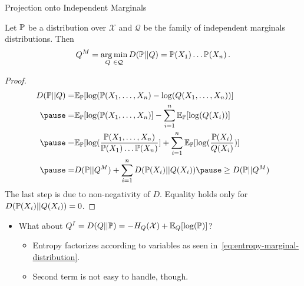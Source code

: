 \begin{frame}{Projection onto Independent Marginals}
\begin{theorem}
Let $\Pb$ be a distribution over $\mathcal{X}$ and $\mathcal{Q}$ be the family of independent marginals distributions. Then
\begin{equation}
    Q^M = \argmin_{Q \ \in \mathcal{Q}} D(\Pb || Q) = \Pb(X_1) \dots \Pb(X_n)\,.
\end{equation}
\end{theorem}
\pause
\begin{proof}
    \begin{equation}
        \begin{aligned}
            D(\Pb || Q) = &\E_{\Pb}[\log(\Pb(X_1,\ldots,X_n) - \log(Q(X_1,\ldots,X_n))] \\
            \pause = & \E_{\Pb}[\log(\Pb(X_1,\ldots,X_n)] - \sum_{i=1}^n \E_{\Pb}[\log(Q(X_i))] \\
            \pause = & \E_{\Pb}[\log(\frac{\Pb(X_1,\ldots,X_n)}{\Pb(X_1) \dots \Pb(X_n)}] + \sum_{i=1}^n \E_{\Pb}[\log(\frac{\Pb(X_i)}{Q(X_i)})] \\
            \pause = & D(\Pb || Q^M) + \sum_{i=1}^n D(\Pb(X_i) || Q(X_i)) \pause \geq D(\Pb || Q^M)
        \end{aligned}
    \end{equation}
    \pause
        The last step is due to non-negativity of $D$.
    \pause
        Equality holds only for $D(\Pb(X_i) || Q(X_i)) = 0$.%
\end{proof}
%
\begin{itemize}
    \pause \item What about $Q^I = 
        D(Q || \Pb) = - H_Q(\mathcal{X}) + \E_{Q}[\log(\Pb)]$?%
    \begin{itemize}
        \pause \item Entropy factorizes according to variables as seen in~\eqref{eq:entropy-marginal-distribution}.
        \pause \item Second term is not easy to handle, though.
    \end{itemize}
\end{itemize}
\end{frame}

